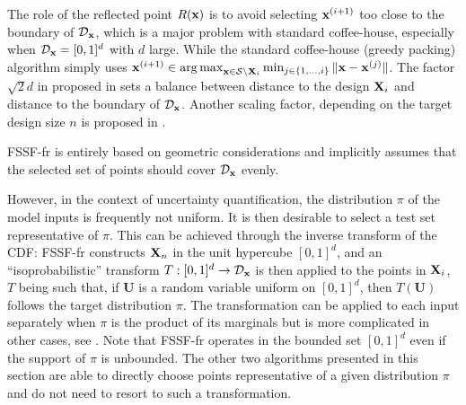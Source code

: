 The role of the reflected point $R({\bf x})$ is to avoid selecting ${\bf x}^{(i+1)}$ too close to the boundary of $\mathcal{D}_{\bf x}$, which is a major problem with standard coffee-house, especially when $\mathcal{D}_{\bf x}=[0,1]^d$ with $d$ large. 
While the standard coffee-house (greedy packing) algorithm simply uses ${\bf x}^{(i+1)} \in \operatorname*{arg\,max}_{{\bf x} \in \mathcal{S} \setminus {\bf X}_i} \min_{j \in \{1,\ldots,i\}} \|{\bf x}-{\bf x}^{(j)}\|$. 
The factor $\sqrt{2}d$ in  proposed in \citet{shang_apley_2020} sets a balance between distance to the design ${\bf X}_i$ and distance to the boundary of $\mathcal{D}_{\bf x}$. 
Another scaling factor, depending on the target design size $n$ is proposed in \citet{NogalesPR2021}.
 
FSSF-fr is entirely based on geometric considerations and implicitly assumes that the selected set of points should cover $\mathcal{D}_{\bf x}$ evenly. 

However, in the context of uncertainty quantification, the distribution $\pi$ of the model inputs is frequently not uniform. 
It is then desirable to select a test set representative of $\pi$. 
This can be achieved through the inverse transform of the CDF: FSSF-fr constructs ${\bf X}_n$ in the unit hypercube $[0,1]^d$, and an ``isoprobabilistic'' transform $T:[0,1]^d \rightarrow \mathcal{D}_{\bf x}$ is then applied to the points in ${\bf X}_i$, $T$ being such that, if $\boldsymbol{U}$ is a random variable uniform on $[0,1]^d$, then $T(\boldsymbol{U})$ follows the target distribution $\pi$. 
The transformation can be applied to each input separately when $\pi$ is the product of its marginals but is more complicated in other cases, see \citep[Chap.~4]{lemaire_2009}. 
Note that FSSF-fr operates in the bounded set $[0,1]^d$ even if the support of $\pi$ is unbounded. 
The other two algorithms presented in this section are able to directly choose points representative of a given distribution $\pi$ and do not need to resort to such a transformation.

